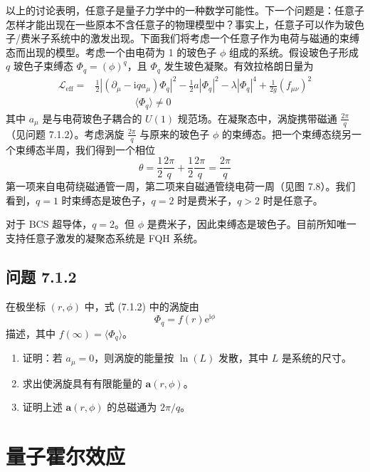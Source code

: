 以上的讨论表明，任意子是量子力学中的一种数学可能性。下一个问题是：任意子怎样才能出现在一些原本不含任意子的物理模型中？事实上，任意子可以作为玻色子/费米子系统中的激发出现。下面我们将考虑一个任意子作为电荷与磁通的束缚态而出现的模型。考虑一个由电荷为 1 的玻色子 $\phi$ 组成的系统。假设玻色子形成 $q$ 玻色子束缚态 $\Phi_q=(\phi)^q$，且 $\Phi_q$ 发生玻色凝聚。有效拉格朗日量为
\begin{align*}
\mathcal{L}_{\text{eff}} ={}& \frac{1}{2}\left|(\partial_\mu-\mathrm{i}q a_\mu)\Phi_q\right|^2 - \frac{1}{2}a\left|\Phi_q\right|^2 - \lambda\left|\Phi_q\right|^4 + \frac{1}{2g}\left(f_{\mu\nu}\right)^2 \tag{7.1.2}\\
&\qquad\qquad \langle\Phi_q\rangle \neq 0
\end{align*}
其中 $a_\mu$ 是与电荷玻色子耦合的 $U(1)$ 规范场。在凝聚态中，涡旋携带磁通 $\frac{2\pi}{q}$（见问题 7.1.2）。考虑涡旋 $\frac{2\pi}{q}$ 与原来的玻色子 $\phi$ 的束缚态。把一个束缚态绕另一个束缚态半周，我们得到一个相位
\begin{equation*}
\theta = \frac{1}{2}\frac{2\pi}{q} + \frac{1}{2}\frac{2\pi}{q} = \frac{2\pi}{q}
\end{equation*}
第一项来自电荷绕磁通管一周，第二项来自磁通管绕电荷一周（见图 7.8）。我们看到，$q=1$ 时束缚态是玻色子，$q=2$ 时是费米子，$q>2$ 时是任意子。

对于 BCS 超导体，$q=2$。但 $\phi$ 是费米子，因此束缚态是玻色子。目前所知唯一支持任意子激发的凝聚态系统是 FQH 系统。

\subsection*{问题 7.1.2}

在极坐标 $(r,\phi)$ 中，式 (7.1.2) 中的涡旋由
\begin{equation*}
\Phi_q = f(r)\mathrm{e}^{\mathrm{i}\phi}
\end{equation*}
描述，其中 $f(\infty)=\langle\Phi_q\rangle$。
\begin{enumerate}
\item[(a)] 证明：若 $a_\mu=0$，则涡旋的能量按 $\ln(L)$ 发散，其中 $L$ 是系统的尺寸。
\item[(b)] 求出使涡旋具有有限能量的 $\pmb{a}(r,\phi)$。
\item[(c)] 证明上述 $\pmb{a}(r,\phi)$ 的总磁通为 $2\pi/q$。
\end{enumerate}

\section{量子霍尔效应}

